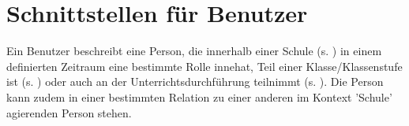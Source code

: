 \section{Schnittstellen für Benutzer}
Ein Benutzer beschreibt eine Person, die innerhalb einer Schule (s. ) in einem definierten Zeitraum eine bestimmte Rolle innehat, Teil einer Klasse/Klassenstufe ist (s. ) oder auch an der Unterrichtsdurchführung teilnimmt (s. ). Die Person kann zudem in einer bestimmten Relation zu einer anderen im Kontext 'Schule' agierenden Person stehen.







% 

